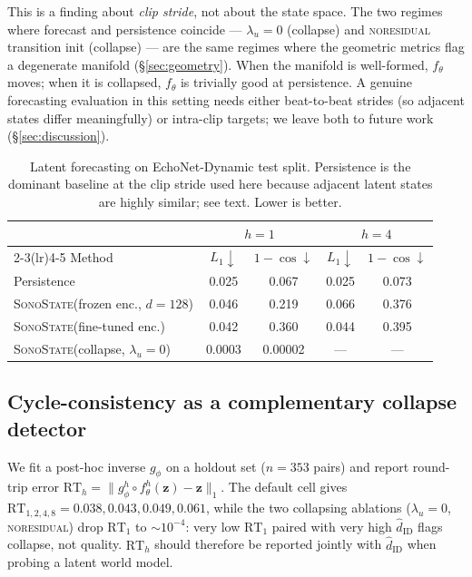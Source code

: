 \documentclass[runningheads]{llncs}
\newcommand{\sonostate}{\textsc{SonoState}\xspace}
\begin{document}
This is a finding about \emph{clip stride}, not about the state space.
The two regimes where forecast and persistence coincide --- $\lambda_u{=}0$
(collapse) and \textsc{noresidual} transition init (collapse) --- are the
same regimes where the geometric metrics flag a degenerate manifold
(\S\ref{sec:geometry}). When the manifold is well-formed, $f_\theta$
moves; when it is collapsed, $f_\theta$ is trivially good at persistence.
A genuine forecasting evaluation in this setting needs either beat-to-beat
strides (so adjacent states differ meaningfully) or intra-clip targets;
we leave both to future work (\S\ref{sec:discussion}).

\begin{table}[t]
\centering
\caption{Latent forecasting on EchoNet-Dynamic test split. Persistence is
the dominant baseline at the clip stride used here because adjacent
latent states are highly similar; see text. Lower is better.}
\label{tab:forecast}
\begin{tabular}{lcccc}
\toprule
& \multicolumn{2}{c}{$h{=}1$} & \multicolumn{2}{c}{$h{=}4$} \\
\cmidrule(lr){2-3}\cmidrule(lr){4-5}
Method & $L_1\downarrow$ & $1{-}\cos\downarrow$
       & $L_1\downarrow$ & $1{-}\cos\downarrow$ \\
\midrule
Persistence                                & 0.025 & 0.067 & 0.025 & 0.073 \\
\sonostate (frozen enc., $d{=}128$)        & 0.046 & 0.219 & 0.066 & 0.376 \\
\sonostate (fine-tuned enc.)               & 0.042 & 0.360 & 0.044 & 0.395 \\
\sonostate (collapse, $\lambda_u{=}0$)     & 0.0003 & 0.00002 & --- & --- \\
\bottomrule
\end{tabular}
\end{table}

\subsection{Cycle-consistency as a complementary collapse detector}
\label{sec:cycle}

We fit a post-hoc inverse $g_\phi$ on a holdout set
($n{=}353$ pairs) and report round-trip error
$\mathrm{RT}_h\!=\!\lVert g_\phi^h \circ f_\theta^h(\mathbf{z}) - \mathbf{z}\rVert_1$.
The default cell gives $\mathrm{RT}_{1,2,4,8}\!=\!0.038, 0.043, 0.049, 0.061$,
while the two collapsing ablations ($\lambda_u{=}0$, \textsc{noresidual})
drop $\mathrm{RT}_1$ to ${\sim}10^{-4}$: very low $\mathrm{RT}_1$ paired
with very high $\widehat{d}_\mathrm{ID}$ flags collapse, not quality.
$\mathrm{RT}_h$ should therefore be reported jointly with
$\widehat{d}_\mathrm{ID}$ when probing a latent world model.
\end{document}
